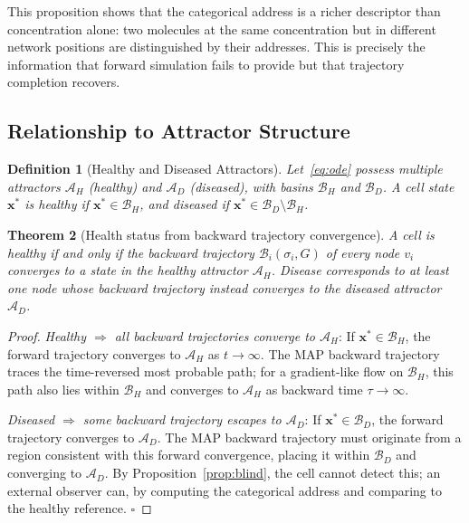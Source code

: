 \documentclass[twocolumn,10pt,a4paper]{article}
\newcommand{\Back}{\mathcal{B}}
\newtheorem{theorem}{Theorem}[section]
\newtheorem{definition}[theorem]{Definition}
\begin{document}
This proposition shows that the categorical address is a richer descriptor
than concentration alone: two molecules at the same concentration but in
different network positions are distinguished by their addresses.  This is
precisely the information that forward simulation fails to provide but that
trajectory completion recovers.

\subsection{Relationship to Attractor Structure}
\label{sec:backward-attractor}

\begin{definition}[Healthy and Diseased Attractors]
\label{def:attractors}
Let~\eqref{eq:ode} possess multiple attractors $\mathcal{A}_H$ (healthy) and
$\mathcal{A}_D$ (diseased), with basins $\mathcal{B}_H$ and $\mathcal{B}_D$.
A cell state $\mathbf{x}^*$ is \emph{healthy} if
$\mathbf{x}^*\in\mathcal{B}_H$, and \emph{diseased} if
$\mathbf{x}^*\in\mathcal{B}_D\setminus\mathcal{B}_H$.
\end{definition}

\begin{theorem}[Health status from backward trajectory convergence]
\label{thm:health-address}
A cell is healthy if and only if the backward trajectory $\Back_i(\sigma_i,G)$
of every node $v_i$ converges to a state in the healthy attractor
$\mathcal{A}_H$.  Disease corresponds to at least one node whose backward
trajectory instead converges to the diseased attractor $\mathcal{A}_D$.
\end{theorem}

\begin{proof}
\emph{Healthy $\Rightarrow$ all backward trajectories converge to $\mathcal{A}_H$}:
If $\mathbf{x}^*\in\mathcal{B}_H$, the forward trajectory converges to
$\mathcal{A}_H$ as $t\to\infty$.  The MAP backward trajectory traces the
time-reversed most probable path; for a gradient-like flow on $\mathcal{B}_H$,
this path also lies within $\mathcal{B}_H$ and converges to $\mathcal{A}_H$
as backward time $\tau\to\infty$.

\emph{Diseased $\Rightarrow$ some backward trajectory escapes to $\mathcal{A}_D$}:
If $\mathbf{x}^*\in\mathcal{B}_D$, the forward trajectory converges to
$\mathcal{A}_D$.  The MAP backward trajectory must originate from a region
consistent with this forward convergence, placing it within $\mathcal{B}_D$
and converging to $\mathcal{A}_D$.  By Proposition~\ref{prop:blind}, the cell
cannot detect this; an external observer can, by computing the categorical
address and comparing to the healthy reference.  $\square$
\end{proof}
\end{document}
